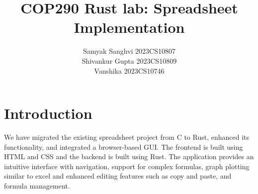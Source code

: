 \documentclass[10pt,a4paper]{article}  %
\title{COP290 Rust lab: Spreadsheet Implementation}
\author{Samyak Sanghvi 2023CS10807\\Shivankur Gupta 2023CS10809\\ Vanshika 2023CS10746 }
\begin{document}
\maketitle



\tableofcontents

\section{Introduction}
We have migrated the existing spreadsheet project from C to Rust, enhanced its functionality, and integrated a browser-based GUI. The frontend is built using HTML and CSS and the backend is built using Rust. The application provides an intuitive interface with navigation, support for complex formulas, graph plotting similar to excel and enhanced editing features such as copy and paste, and formula management.
\end{document}

